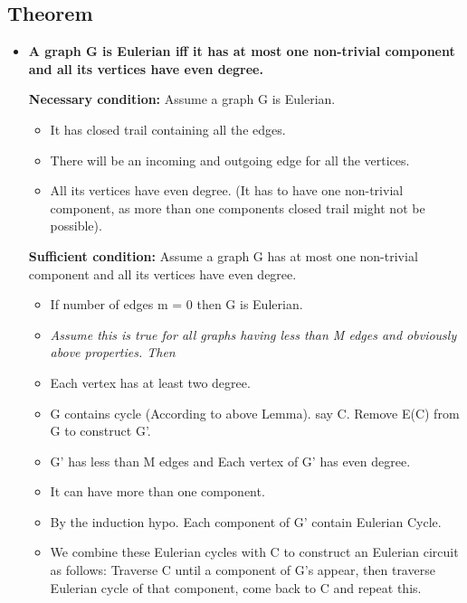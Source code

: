 \subsection{Theorem}
\begin{itemize}
    \item \textbf{A graph G is Eulerian iff it has at most one
    non-trivial component and all its vertices have even degree.}

    \textbf{Necessary condition:} Assume a graph G is Eulerian.
    \begin{itemize}
        \item It has closed trail containing all the edges.
        \item There will be an incoming and outgoing edge for all the vertices.
        \item All its vertices have even degree. (It has to have one non-trivial
        component, as more than one components closed trail might not
        be possible).
    \end{itemize} 

    \textbf{Sufficient condition:}  Assume a graph G has at most one
    non-trivial component and all its vertices have even degree.
    \begin{itemize}
        \item If number of edges m = 0 then G is Eulerian.
        \item \textit{Assume this is true for all graphs having less than M edges and
        obviously above properties. Then}
        \item Each vertex has at least two degree.
        \item G contains cycle (According to above Lemma). say C. Remove E(C) from G to construct G’.
        \item G’ has less than M edges and Each vertex of G’ has even degree.
        \item It can have more than one component. 
        \item By the induction hypo. Each component of G’ contain Eulerian Cycle.
        \item We combine these Eulerian cycles with C to construct an
        Eulerian circuit as follows: Traverse C until a component of G’s
        appear, then traverse Eulerian cycle of that component, come
        back to C and repeat this.

    \end{itemize}    
\end{itemize}
